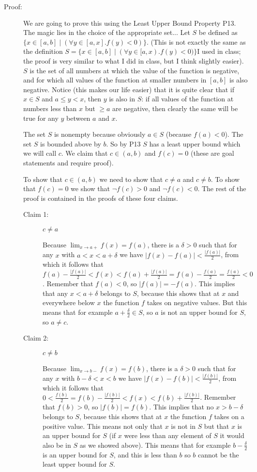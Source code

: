 \documentclass[12pt]{article}
\begin{document}
\begin{description}
\item[Proof:]  We are going to prove this using the Least Upper Bound Property P13.  The magic lies in the choice of the appropriate set...  Let $S$ be defined as $\{x \in [a,b]\mid (\forall y \in [a,x].f(y)<0)\}$.  (This is not exactly the same as the definition $S=\{x \in [a,b]\mid (\forall y \in [a,x).f(y)<0)\}$I used in class; the proof is very similar to what I did in class, but I think slightly easier).  $S$ is the set of all numbers at which the value of the function is negative, and for which all values of the function at smaller numbers in $[a,b]$ is also negative.  Notice (this makes our life easier) that it is quite clear that if $x \in S$ and $a \leq y <x$, then $y$ is also in $S$:  if all values of the function at numbers less than $x$ but $\geq a$ are negative, then clearly the same will be
true for any $y$ between $a$ and $x$. 

The set $S$ is nonempty because obviously $a \in S$ (because $f(a)<0$).  The set $S$ is bounded above by $b$.  So by P13 $S$ has a least upper bound which we will call $c$.  We claim that $c \in (a,b)$ and $f(c)=0$ (these are goal statements and require proof).

To show that $c \in (a,b)$ we need to show that $c \neq a$ and $c \neq b$.  To show that $f(c)=0$ we show that $\neg f(c)>0$ and $\neg f(c)<0$.  The rest of the proof is contained in the proofs of these four claims.

\begin{description}

\item[Claim 1:]  $c \neq a$

Because $\lim_{x \rightarrow a+}f(x)=f(a)$, there is a $\delta>0$ such that for any $x$ with $a < x <a+\delta$ we have $|f(x)-f(a)|<\frac{|f(a)|}2$, from which it follows that
$f(a)-\frac{|f(a)|}2<f(x)<f(a)+\frac{|f(a)|}2=f(a)-\frac{f(a)}2=\frac{f(a)}2<0$.  Remember that $f(a)<0$, so $|f(a)|=-f(a)$.  This implies that any $x<a+\delta$ belongs to $S$, because this shows that at $x$
and everywhere below $x$ the function $f$ takes on negative values.  But this means that for example $a +\frac{\delta}2 \in S$, so $a$ is not an upper bound for $S$, so $a \neq c$.


\item[Claim 2:]  $c \neq b$

Because $\lim_{x \rightarrow b-}f(x)=f(b)$, there is a $\delta>0$ such that for any $x$ with $b-\delta < x <b$ we have $|f(x)-f(b)|<\frac{|f(b)|}2$, from which it follows that
$0<\frac{f(b)}2=f(b)-\frac{|f(b)|}2<f(x)<f(b)+\frac{|f(b)|}2$.  Remember that $f(b)>0$, so $|f(b)|=f(b)$.  This implies that no $x>b-\delta$ belongs to $S$, because this shows that at $x$ the function $f$ takes on a positive value.  This means not only that $x$ is not in $S$ but that $x$ is an upper bound for $S$ (if $x$ were less than any element of $S$ it would also be in $S$ as we showed above).  This means that for example $b-\frac{\delta}2$ is an upper bound for $S$, and this is less than $b$ so $b$ cannot be the least upper bound for $S$.




\end{description}
\end{description}
\end{document}

